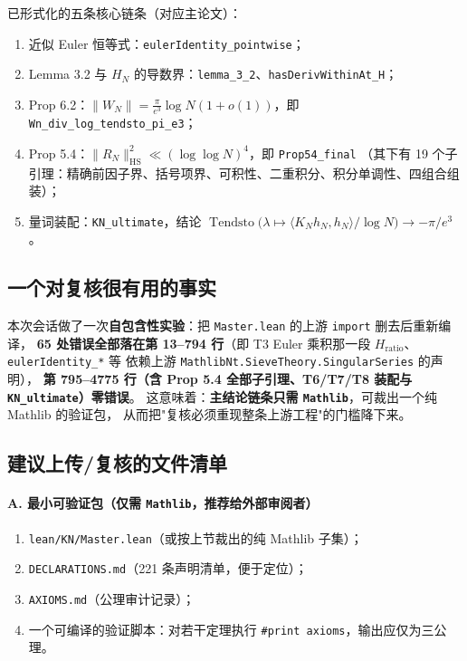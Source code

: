 \documentclass[11pt,a4paper]{ctexart}
\newcommand{\HS}{\mathrm{HS}}
\begin{document}
\noindent
已形式化的五条核心链条（对应主论文）：
\begin{enumerate}[label=(\arabic*),leftmargin=2.2em]
\item 近似 Euler 恒等式：\texttt{eulerIdentity\_pointwise}；
\item Lemma 3.2 与 $H_N$ 的导数界：\texttt{lemma\_3\_2}、\texttt{hasDerivWithinAt\_H}；
\item Prop 6.2：$\|W_N\|=\frac{\pi}{e^3}\log N(1+o(1))$，即 \texttt{Wn\_div\_log\_tendsto\_pi\_e3}；
\item Prop 5.4：$\|R_N\|_{\HS}^2\ll(\log\log N)^4$，即 \texttt{Prop54\_final}
（其下有 19 个子引理：精确前因子界、括号项界、可积性、二重积分、积分单调性、四组合组装）；
\item 量词装配：\texttt{KN\_ultimate}，结论
$\operatorname{Tendsto}\bigl(\lambda\mapsto\langle K_Nh_N,h_N\rangle/\log N\bigr)\to-\pi/e^3$。
\end{enumerate}

\subsection{一个对复核很有用的事实}

本次会话做了一次\textbf{自包含性实验}：把 \texttt{Master.lean} 的上游 \texttt{import} 删去后重新编译，
\textbf{65 处错误全部落在第 13--794 行}（即 T3 Euler 乘积那一段 $H_{\mathrm{ratio}}$、\texttt{eulerIdentity\_*} 等
依赖上游 \texttt{MathlibNt.SieveTheory.SingularSeries} 的声明），
\textbf{第 795--4775 行（含 Prop 5.4 全部子引理、T6/T7/T8 装配与 \texttt{KN\_ultimate}）零错误}。
这意味着：\textbf{主结论链条只需 \texttt{Mathlib}}，可裁出一个纯 Mathlib 的验证包，
从而把"复核必须重现整条上游工程"的门槛降下来。

\subsection{建议上传/复核的文件清单}

\paragraph{A. 最小可验证包（仅需 \texttt{Mathlib}，推荐给外部审阅者）}
\begin{enumerate}[leftmargin=2.2em]
\item \texttt{lean/KN/Master.lean}（或按上节裁出的纯 Mathlib 子集）；
\item \texttt{DECLARATIONS.md}（221 条声明清单，便于定位）；
\item \texttt{AXIOMS.md}（公理审计记录）；
\item 一个可编译的验证脚本：对若干定理执行 \texttt{\#print axioms}，输出应仅为三公理。
\end{enumerate}
\end{document}
